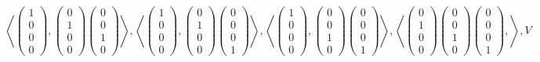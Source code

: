 \documentclass{scrreprt}
\begin{document}
\[
  \left\langle
    \begin{pmatrix}1\\0\\0\\0\end{pmatrix},
    \begin{pmatrix}0\\1\\0\\0\end{pmatrix}
    \begin{pmatrix}0\\0\\1\\0\end{pmatrix}
  \right\rangle,
  \left\langle
    \begin{pmatrix}1\\0\\0\\0\end{pmatrix},
    \begin{pmatrix}0\\1\\0\\0\end{pmatrix}
    \begin{pmatrix}0\\0\\0\\1\end{pmatrix}
  \right\rangle,
  \left\langle
    \begin{pmatrix}1\\0\\0\\0\end{pmatrix},
    \begin{pmatrix}0\\0\\1\\0\end{pmatrix}
    \begin{pmatrix}0\\0\\0\\1\end{pmatrix}
  \right\rangle,
  \left\langle
    \begin{pmatrix}0\\1\\0\\0\end{pmatrix}
    \begin{pmatrix}0\\0\\1\\0\end{pmatrix}
    \begin{pmatrix}0\\0\\0\\1\end{pmatrix},
  \right\rangle,
  V
\]
\end{document}
